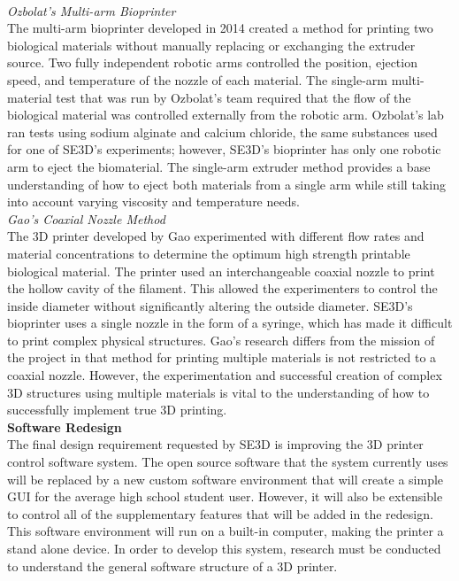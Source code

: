 \\
\textit{Ozbolat’s Multi-arm Bioprinter}
\\
The multi-arm bioprinter developed in 2014 created a method for printing two biological materials without manually replacing or exchanging the extruder source. Two fully independent robotic arms controlled the position, ejection speed, and temperature of the nozzle of each material. The single-arm multi-material test that was run by Ozbolat’s team required that the flow of the biological material was controlled externally from the robotic arm. Ozbolat’s lab ran tests using sodium alginate and calcium chloride, the same substances used for one of SE3D’s experiments; however, SE3D’s bioprinter has only one robotic arm to eject the biomaterial. The single-arm extruder method provides a base understanding of how to eject both materials from a single arm while still taking into account varying viscosity and temperature needs. 
\\
\textit{Gao’s Coaxial Nozzle Method}
\\
The 3D printer developed by Gao experimented with different flow rates and material concentrations to determine the optimum high strength printable biological material. The printer used an interchangeable coaxial nozzle to print the hollow cavity of the filament. This allowed the experimenters to control the inside diameter without significantly altering the outside diameter. SE3D’s bioprinter uses a single nozzle in the form of a syringe, which has made it difficult to print complex physical structures. Gao’s research differs from the mission of the project in that method for printing multiple materials is not restricted to a coaxial nozzle. However, the experimentation and successful creation of complex 3D structures using multiple materials is vital to the understanding of how to successfully implement true 3D printing. 
\\
\textbf{Software Redesign}
\\
The final design requirement requested by SE3D is improving the 3D printer control software system. The open source software that the system currently uses will be replaced by a new custom software environment that will create a simple GUI for the average high school student user. However, it will also be extensible to control all of the supplementary features that will be added in the redesign. This software environment will run on a built-in computer, making the printer a stand alone device. In order to develop this system, research must be conducted to understand the general software structure of a 3D printer.

